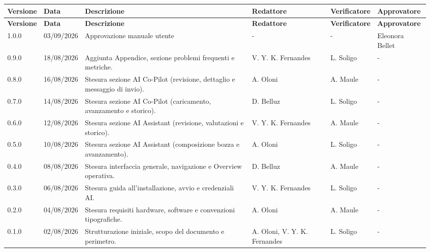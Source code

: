 \documentclass[a4paper,12pt]{article}
\begin{document}
\renewcommand{\arraystretch}{1.35}
\begin{center}
    {\footnotesize
    \begin{longtable}{|p{1.4cm}|p{1.8cm}|p{5cm}|p{2.4cm}|p{2.3cm}|p{2.3cm}|}
        \hline
        \rowcolor{gray!20}
        \textbf{Versione} & \textbf{Data} & \textbf{Descrizione} & \textbf{Redattore} & \textbf{Verificatore} & \textbf{Approvatore} \\
        \hline
        \endfirsthead
        \hline
        \rowcolor{gray!20}
        \textbf{Versione} & \textbf{Data} & \textbf{Descrizione} & \textbf{Redattore} & \textbf{Verificatore} & \textbf{Approvatore} \\
        \hline
        \endhead
        1.0.0 & 03/09/2026 & Approvazione manuale utente & - & - & Eleonora Bellet\\
        \hline
        0.9.0 & 18/08/2026 & Aggiunta Appendice, sezione problemi frequenti e metriche. & V. Y. K. Fernandes & L. Soligo & - \\
        \hline
        0.8.0 & 16/08/2026 & Stesura sezione AI Co-Pilot (revisione, dettaglio e messaggio di invio). & A. Oloni & A. Maule & - \\
        \hline
        0.7.0 & 14/08/2026 & Stesura sezione AI Co-Pilot (caricamento, avanzamento e storico). & D. Belluz & L. Soligo & - \\
        \hline
        0.6.0 & 12/08/2026 & Stesura sezione AI Assistant (revisione, valutazioni e storico). & V. Y. K. Fernandes & A. Maule & - \\
        \hline
        0.5.0 & 10/08/2026 & Stesura sezione AI Assistant (composizione bozza e avanzamento). & A. Oloni & L. Soligo & - \\
        \hline
        0.4.0 & 08/08/2026 & Stesura interfaccia generale, navigazione e Overview operativa. & D. Belluz & A. Maule & - \\
        \hline
        0.3.0 & 06/08/2026 & Stesura guida all'installazione, avvio e credenziali AI. & V. Y. K. Fernandes & L. Soligo & - \\
        \hline
        0.2.0 & 04/08/2026 & Stesura requisiti hardware, software e convenzioni tipografiche. & A. Oloni & A. Maule & - \\
        \hline
        0.1.0 & 02/08/2026 & Strutturazione iniziale, scopo del documento e perimetro. & A. Oloni, \newline V. Y. K. Fernandes & L. Soligo & - \\
        \hline
    \end{longtable}
    }
\end{center}
\end{document}
